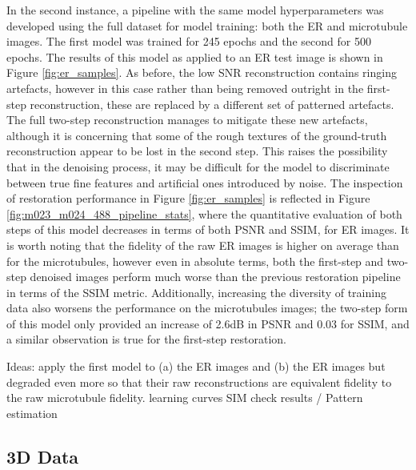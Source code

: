 \documentclass[12pt]{article}
\begin{document}
In the second instance, a pipeline with the same model hyperparameters was developed using the full dataset for model training:
both the ER and microtubule images.
The first model was trained for 245 epochs and the second for 500 epochs.
The results of this model as applied to an ER test image is shown in Figure \ref{fig:er_samples}.
As before, the low SNR reconstruction contains ringing artefacts,
however in this case rather than being removed outright in the first-step reconstruction,
these are replaced by a different set of patterned artefacts.
The full two-step reconstruction manages to mitigate these new artefacts,
although it is concerning that some of the rough textures of the ground-truth reconstruction appear to be lost in the second step.
This raises the possibility that in the denoising process,
it may be difficult for the model to discriminate between true fine features and artificial ones introduced by noise.
The inspection of restoration performance in Figure \ref{fig:er_samples} is reflected in Figure \ref{fig:m023_m024_488_pipeline_stats},
where the quantitative evaluation of both steps of this model decreases in terms of both PSNR and SSIM, for ER images.
It is worth noting that the fidelity of the raw ER images is higher on average than for the microtubules,
however even in absolute terms, both the first-step and two-step denoised images perform much worse than the previous restoration pipeline in terms of the SSIM metric.
Additionally, increasing the diversity of training data also worsens the performance on the microtubules images;
the two-step form of this model only provided an increase of 2.6dB in PSNR and 0.03 for SSIM,
and a similar observation is true for the first-step restoration.

Ideas: apply the first model to (a) the ER images and
(b) the ER images but degraded even more so that their raw reconstructions are equivalent fidelity to the raw microtubule fidelity.
learning curves
SIM check results / Pattern estimation


\subsection{3D Data}
\end{document}
